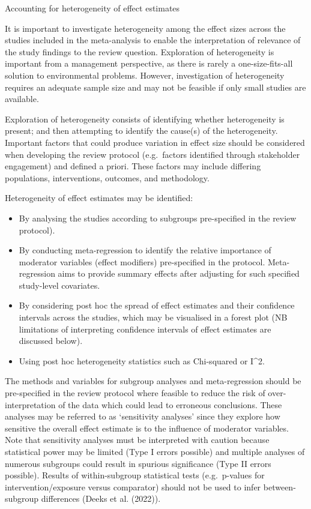 \documentclass[
  letterpaper,
  DIV=11,
  numbers=noendperiod]{scrreprt}
\begin{document}
Accounting for heterogeneity of effect estimates

It is important to investigate heterogeneity among the effect sizes
across the studies included in the meta-analysis to enable the
interpretation of relevance of the study findings to the review
question. Exploration of heterogeneity is important from a management
perspective, as there is rarely a one-size-fits-all solution to
environmental problems. However, investigation of heterogeneity requires
an adequate sample size and may not be feasible if only small studies
are available.

Exploration of heterogeneity consists of identifying whether
heterogeneity is present; and then attempting to identify the cause(s)
of the heterogeneity. Important factors that could produce variation in
effect size should be considered when developing the review protocol
(e.g.~factors identified through stakeholder engagement) and defined a
priori. These factors may include differing populations, interventions,
outcomes, and methodology.

Heterogeneity of effect estimates may be identified:

\begin{itemize}
\item
  By analysing the studies according to subgroups pre-specified in the
  review protocol).
\item
  By conducting meta-regression to identify the relative importance of
  moderator variables (effect modifiers) pre-specified in the protocol.
  Meta-regression aims to provide summary effects after adjusting for
  such specified study-level covariates.
\item
  By considering post hoc the spread of effect estimates and their
  confidence intervals across the studies, which may be visualised in a
  forest plot (NB limitations of interpreting confidence intervals of
  effect estimates are discussed below).
\item
  Using post hoc heterogeneity statistics such as Chi-squared or I\^{}2.
\end{itemize}

The methods and variables for subgroup analyses and meta-regression
should be pre-specified in the review protocol where feasible to reduce
the risk of over-interpretation of the data which could lead to
erroneous conclusions. These analyses may be referred to as `sensitivity
analyses' since they explore how sensitive the overall effect estimate
is to the influence of moderator variables. Note that sensitivity
analyses must be interpreted with caution because statistical power may
be limited (Type I errors possible) and multiple analyses of numerous
subgroups could result in spurious significance (Type II errors
possible). Results of within-subgroup statistical tests (e.g.~p-values
for intervention/exposure versus comparator) should not be used to infer
between-subgroup differences (Deeks et al. (2022)).
\end{document}
